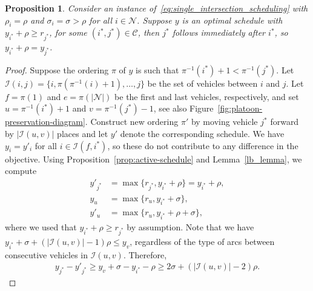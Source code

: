 \documentclass[a4paper]{article}
\theoremstyle{definition}
\theoremstyle{plain}
\newtheorem{proposition}{Proposition}
\begin{document}
\begin{proposition}\label{prop:exhaustive}
  Consider an instance of~\eqref{eq:single_intersection_scheduling} with $\rho_{i} = \rho$ and $\sigma_{i} = \sigma > \rho$ for all
  $i \in \mathcal{N}$. Suppose $y$ is an optimal schedule with
  $y_{i^{*}} + \rho \geq r_{j^{*}}$, for some $(i^{*},j^{*}) \in \mathcal{C}$, then
  $j^{*}$ follows immediately after $i^{*}$, so $y_{i^{*}} + \rho = y_{j^{*}}$.
\end{proposition}
\begin{proof}
  Suppose the ordering $\pi$ of $y$ is such that
  $\pi^{-1}(i^{*}) + 1 < \pi^{-1}(j^{*})$.
  Let $\mathcal{I}(i,j) = \{ i, \pi(\pi^{-1}(i) + 1), \dots, j \}$ be the set of
  vehicles between $i$ and $j$.
  Let $f = \pi(1)$ and $e = \pi(|\mathcal{N}|)$ be the first and last vehicles,
  respectively, and set $u = \pi^{-1}(i^{*}) + 1$ and $v = \pi^{-1}(j^{*}) - 1$, see also Figure~\ref{fig:platoon-preservation-diagram}.
  Construct new ordering $\pi'$ by moving vehicle $j^{*}$ forward
  by $|\mathcal{I}(u,v)|$ places and let $y'$ denote the corresponding schedule.
  We have $y_{i} = y'_{i}$ for all $i \in \mathcal{I}(f, i^{*})$, so these do not
  contribute to any difference in the objective.
  Using Proposition~\ref{prop:active-schedule} and Lemma~\ref{lb_lemma}, we compute
  \begin{align*}
    y'_{j^{*}} &= \max \{ r_{j^{*}}, y_{i^{*}} + \rho \} = y_{i^{*}} + \rho , \\
    y_{u} &= \max \{ r_{u}, y_{i^{*}} + \sigma \} , \\
    y'_{u} &= \max \{ r_{u}, y_{i^{*}} + \rho + \sigma \} ,
  \end{align*}
  where we used that $y_{i^{*}} + \rho \geq r_{j^{*}}$ by assumption.
  Note that we have
  $y_{i^{*}} + \sigma + (|\mathcal{I}(u,v)| - 1) \rho \leq y_{v}$, regardless of the
  type of arcs between consecutive vehicles in $\mathcal{I}(u,v)$. Therefore,
  \begin{align*}
    y_{j^{*}} - y'_{j^{*}} \geq y_{v} + \sigma - y_{i^{*}} - \rho \geq 2 \sigma + (|\mathcal{I}(u,v)| - 2) \rho .
  \end{align*}


\end{proof}
\end{document}
